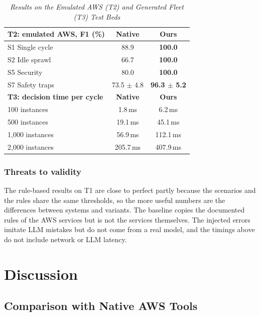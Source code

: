 \documentclass{ieeeaccess}
\begin{document}
\begin{table}[ht]
\caption{\textit{Results on the Emulated AWS (T2) and Generated Fleet (T3) Test Beds}}
\centering
\setlength{\tabcolsep}{4pt}
\begin{tabular}{lcc}
\toprule
\textbf{T2: emulated AWS, F1 (\%)} & \textbf{Native} & \textbf{Ours} \\
\midrule
S1 Single cycle    & 88.9 & \textbf{100.0} \\
S2 Idle sprawl     & 66.7 & \textbf{100.0} \\
S5 Security        & 80.0 & \textbf{100.0} \\
S7 Safety traps    & 73.5 $\pm$ 4.8 & \textbf{96.3 $\pm$ 5.2} \\
\midrule
\textbf{T3: decision time per cycle} & \textbf{Native} & \textbf{Ours} \\
\midrule
100 instances      & 1.8\,ms   & 6.2\,ms \\
500 instances      & 19.1\,ms  & 45.1\,ms \\
1,000 instances    & 56.9\,ms  & 112.1\,ms \\
2,000 instances    & 205.7\,ms & 407.9\,ms \\
\bottomrule
\end{tabular}
\label{tab:testbedres}
\end{table}

\subsubsection{Threats to validity}
The rule-based results on T1 are close to perfect partly because the
scenarios and the rules share the same thresholds, so the more useful numbers
are the differences between systems and variants. The baseline copies the
documented rules of the AWS services but is not the services themselves. The
injected errors imitate LLM mistakes but do not come from a real model, and
the timings above do not include network or LLM latency.

\section{Discussion}
\label{sec:discussion}

\subsection{Comparison with Native AWS Tools}
\end{document}
